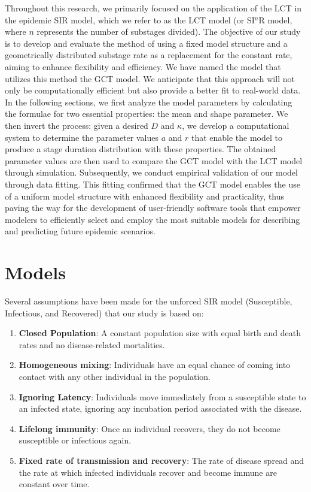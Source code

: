 \documentclass[12pt]{article}
\begin{document}
Throughout this research, we primarily focused on the application of the LCT in the epidemic SIR model, which we refer to as the LCT model (or SI$^n$R model, where $n$ represents the number of substages divided). The objective of our study is to develop and evaluate the method of using a fixed model structure and a geometrically distributed substage rate as a replacement for the constant rate, aiming to enhance flexibility and efficiency. We have named the model that utilizes this method the GCT model. We anticipate that this approach will not only be computationally efficient but also provide a better fit to real-world data. In the following sections, we first analyze the model parameters by calculating the formulae for two essential properties: the mean and shape parameter. We then invert the process: given a desired $D$ and $\kappa$, we develop a computational system to determine the parameter values $a$ and $r$ that enable the model to produce a stage duration distribution with these properties. The obtained parameter values are then used to compare the GCT model with the LCT model through simulation. Subsequently, we conduct empirical validation of our model through data fitting. This fitting confirmed that the GCT model enables the use of a uniform model structure with enhanced flexibility and practicality, thus paving the way for the development of user-friendly software tools that empower modelers to efficiently select and employ the most suitable models for describing and predicting future epidemic scenarios.


\section{Models}
\label{Models}
Several assumptions have been made for the unforced SIR model (Susceptible, Infectious, and Recovered) that our study is based on: 
\begin{enumerate}
    \item \textbf{Closed Population}: A constant population size with equal birth and death rates and no disease-related mortalities.
    \item \textbf{Homogeneous mixing}: Individuals have an equal chance of coming into contact with any other individual in the population. 
    \item \textbf{Ignoring Latency}: Individuals move immediately from a susceptible state to an infected state, ignoring any incubation period associated with the disease.
    \item \textbf{Lifelong immunity}: Once an individual recovers, they do not become susceptible or infectious again.
    \item \textbf{Fixed rate of transmission and recovery}: The rate of disease spread and the rate at which infected individuals recover and become immune are constant over time.
\end{enumerate}
\end{document}

